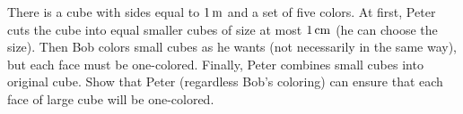 \problem{}
There is a cube with sides equal to $1 \text{\,m}$ and a set of five colors.
At first, Peter cuts the cube into equal smaller cubes of size at most $1 \text{\,cm}$
(he can choose the size).
Then Bob colors small cubes as he wants (not necessarily in the same way), but each face must be 	
one-colored.
Finally, Peter combines small cubes into original cube.
Show that Peter (regardless Bob's coloring)  can ensure that each face of large cube will be 	
one-colored. 
\solution
\endproblem
